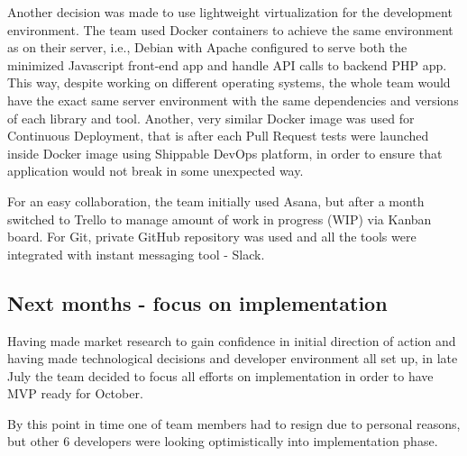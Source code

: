 \documentclass{article}
\begin{document}
Another decision was made to use lightweight virtualization for the development environment. The team used Docker containers to achieve the same environment as on their server, i.e., Debian with Apache configured to serve both the minimized Javascript front-end app and handle API calls to backend PHP app. This way, despite working on different operating systems, the whole team would have the exact same server environment with the same dependencies and versions of each library and tool. Another, very similar Docker image was used for Continuous Deployment, that is after each Pull Request tests were launched inside Docker image using Shippable DevOps platform, in order to ensure that application would not break in some unexpected way.

For an easy collaboration, the team initially used Asana, but after a month switched to Trello to manage amount of work in progress (WIP) via Kanban board. For Git, private GitHub repository was used and all the tools were integrated with instant messaging tool - Slack.

\subsection{Next months - focus on implementation}
Having made market research to gain confidence in initial direction of action and having made technological decisions and developer environment all set up, in late July the team decided to focus all efforts on implementation in order to have MVP ready for October.

By this point in time one of team members had to resign due to personal reasons, but other 6 developers were looking optimistically into implementation phase.
\end{document}
